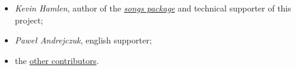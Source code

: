 \begin{itemize}
	\item {\textit{\rmfamily Kevin Hamlen}}, author of the \href{http://songs.sourceforge.net/}{\textit{songs package}} and technical supporter of this project;
	\item {\textit{\rmfamily Paweł Andrejczuk}}, english supporter;
  \item the \href{https://github.com/PietroPrandini/GuitarHub/graphs/contributors}{other contributors}.
\end{itemize}

